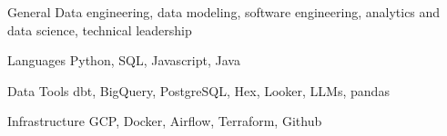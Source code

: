 

\begin{cvskills}
  \cvskill
    {General}
    {Data engineering, data modeling, software engineering, analytics and data science, technical leadership}

  \cvskill
    {Languages}
    {Python, SQL, Javascript, Java}

  \cvskill
    {Data Tools}
    {dbt, BigQuery, PostgreSQL, Hex, Looker, LLMs, pandas}

  \cvskill
    {Infrastructure}
    {GCP, Docker, Airflow, Terraform, Github}

\end{cvskills}
